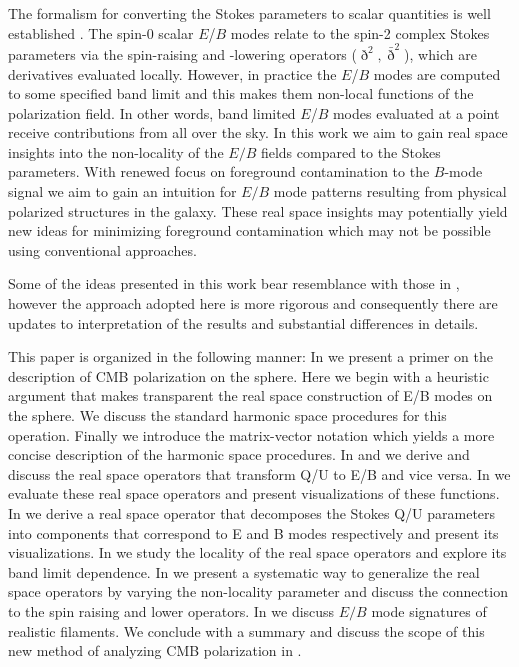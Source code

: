  
The formalism for converting the Stokes parameters to scalar quantities is well established \citep{1997PhRvD..55.7368K,1997PhRvD..55.1830Z}. The spin-0 scalar $E$/$B$ modes relate to the spin-2 complex Stokes parameters via the spin-raising and -lowering operators ($\eth^2,\bar \eth^2$), which are derivatives evaluated locally.  However, in practice the $E$/$B$ modes are computed to some specified band limit and this makes them non-local functions of the polarization field.  In other words, band limited $E$/$B$ modes evaluated at a point receive contributions from all over the sky. In this work we aim to gain real space insights into the non-locality of the $E/B$ fields compared to the Stokes parameters. With renewed focus on foreground contamination to the $B$-mode signal we aim to gain an intuition for $E/B$ mode patterns resulting from physical polarized structures in the galaxy. These real space insights may potentially yield new ideas for minimizing foreground contamination which may not be possible using conventional approaches. 

Some of the ideas presented in this work bear resemblance with those in \citep{Zaldarriaga2001a}, however the approach adopted here is more rigorous and consequently there are updates to interpretation of the results and substantial differences in details.

This paper is organized in the following manner: In  we present a primer on the description of CMB polarization on the sphere. Here we begin with a heuristic argument that makes transparent the real space construction of E/B modes on the sphere. We discuss the standard harmonic space procedures for this operation. Finally we introduce the matrix-vector notation which yields a more concise description of the harmonic space procedures. In  and  we derive and discuss the real space operators that transform Q/U to E/B and vice versa. In  we evaluate these real space operators and present visualizations of these functions. In  we derive a real space operator that decomposes the Stokes Q/U  parameters into components that correspond to E and B modes respectively and present its visualizations.  In  we study the locality of the real space operators and explore its band limit dependence. In  we present a systematic way to generalize the real space operators by varying the non-locality parameter and discuss the connection to the spin raising and lower operators. In  we discuss $E/B$ mode signatures of realistic filaments. We conclude with a summary and discuss the scope of this new method of analyzing CMB polarization in .
